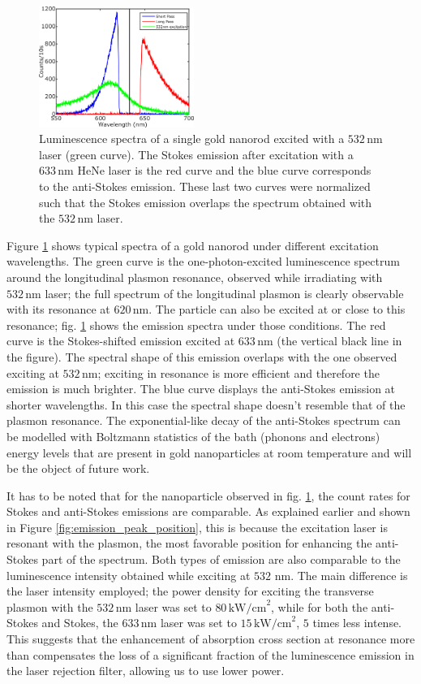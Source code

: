 \documentclass[journal=nalefd,manuscript=letter]{achemso}
\newcommand{\nm}{\ensuremath{\,\textrm{nm}}}
\newcommand{\pwr}{\ensuremath{\,\textrm{kW/cm}^2}}
\begin{document}
\begin{figure}[htp]
\centering
	\includegraphics[width=0.45\textwidth]{Figures/04_3_Curves/3_curves_final.png}
	\caption{Luminescence spectra of a single gold nanorod excited with a $532\nm$
	laser (green curve). The Stokes emission after excitation with a $633\nm$
	HeNe laser is the red curve and the blue curve corresponds to the anti-Stokes
	emission. These last two curves were normalized such that the Stokes emission
	overlaps the spectrum obtained with the $532\nm$ laser.}
	\label{fig:spectra_rod}
\end{figure}

Figure \ref{fig:spectra_rod} shows typical spectra of a gold nanorod under
different excitation wavelengths. The green curve is the one-photon-excited
luminescence spectrum around the longitudinal plasmon resonance,
observed while irradiating with $532\nm$ laser; the full
spectrum of the longitudinal plasmon is clearly observable with its resonance at
$620\nm$. The particle can also be excited at or close to this resonance; fig. 
\ref{fig:spectra_rod} shows the emission spectra under those conditions. The red
curve is the Stokes-shifted emission excited at $633\nm$ (the vertical
black line in the figure). The spectral shape of this emission overlaps with the
one observed exciting at $532\nm$; exciting in resonance is more efficient and
therefore the emission is much brighter. The blue curve displays the anti-Stokes
emission at shorter wavelengths. In this case the spectral shape doesn't
resemble that of the plasmon resonance. The exponential-like decay of the anti-Stokes spectrum can be modelled
with Boltzmann statistics\cite{He2015} of the bath (phonons and electrons) energy levels that are
present in gold nanoparticles at room temperature and will be the object of future work.

It has to be noted that for the nanoparticle observed in fig.
\ref{fig:spectra_rod}, the count rates for Stokes and anti-Stokes emissions are comparable.
As explained earlier and shown in Figure
\ref{fig:emission_peak_position}, this is because the excitation laser is resonant with the plasmon,
the most favorable position for enhancing the anti-Stokes part of the spectrum.
Both types of emission are also comparable to the luminescence intensity
obtained while exciting at $532\,\nm$. The main difference is the laser
intensity employed; the power density for exciting the transverse plasmon with
the $532\nm$ laser was set to $80\pwr$, while for both the anti-Stokes and
Stokes, the $633\nm$ laser was set to $15\pwr$, $5$ times less intense.
This suggests that the enhancement of absorption cross section at resonance
more than compensates the loss of a significant fraction of the luminescence emission in the laser rejection filter, allowing us to use lower power.
\end{document}
